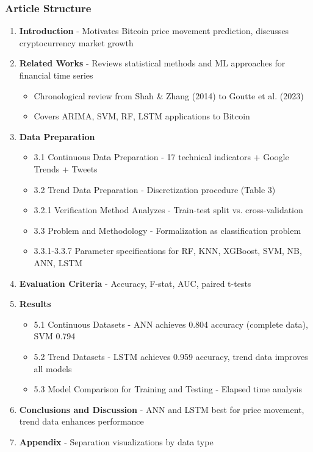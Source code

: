 \documentclass[12pt,a4paper]{article}
\begin{document}
\subsubsection{Article Structure}
\begin{enumerate}
    \item \textbf{Introduction} - Motivates Bitcoin price movement prediction, discusses cryptocurrency market growth
    \item \textbf{Related Works} - Reviews statistical methods and ML approaches for financial time series
    \begin{itemize}
        \item Chronological review from Shah \& Zhang (2014) to Goutte et al. (2023)
        \item Covers ARIMA, SVM, RF, LSTM applications to Bitcoin
    \end{itemize}
    \item \textbf{Data Preparation}
    \begin{itemize}
        \item 3.1 Continuous Data Preparation - 17 technical indicators + Google Trends + Tweets
        \item 3.2 Trend Data Preparation - Discretization procedure (Table 3)
        \item 3.2.1 Verification Method Analyzes - Train-test split vs. cross-validation
        \item 3.3 Problem and Methodology - Formalization as classification problem
        \item 3.3.1-3.3.7 Parameter specifications for RF, KNN, XGBoost, SVM, NB, ANN, LSTM
    \end{itemize}
    \item \textbf{Evaluation Criteria} - Accuracy, F-stat, AUC, paired t-tests
    \item \textbf{Results}
    \begin{itemize}
        \item 5.1 Continuous Datasets - ANN achieves 0.804 accuracy (complete data), SVM 0.794
        \item 5.2 Trend Datasets - LSTM achieves 0.959 accuracy, trend data improves all models
        \item 5.3 Model Comparison for Training and Testing - Elapsed time analysis
    \end{itemize}
    \item \textbf{Conclusions and Discussion} - ANN and LSTM best for price movement, trend data enhances performance
    \item \textbf{Appendix} - Separation visualizations by data type
\end{enumerate}
\end{document}
